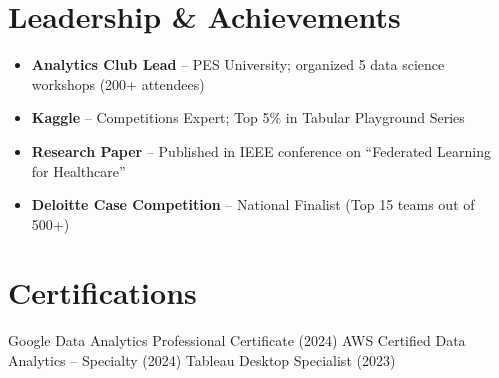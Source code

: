 \documentclass[11pt,a4paper]{article}
\begin{document}
\section{Leadership \& Achievements}
\begin{itemize}
    \item \textbf{Analytics Club Lead} -- PES University; organized 5 data science workshops (200+ attendees)
    \item \textbf{Kaggle} -- Competitions Expert; Top 5\% in Tabular Playground Series
    \item \textbf{Research Paper} -- Published in IEEE conference on ``Federated Learning for Healthcare''
    \item \textbf{Deloitte Case Competition} -- National Finalist (Top 15 teams out of 500+)
\end{itemize}

\section{Certifications}
Google Data Analytics Professional Certificate (2024) \quad\textbar\quad AWS Certified Data Analytics -- Specialty (2024) \quad\textbar\quad Tableau Desktop Specialist (2023)
\end{document}
